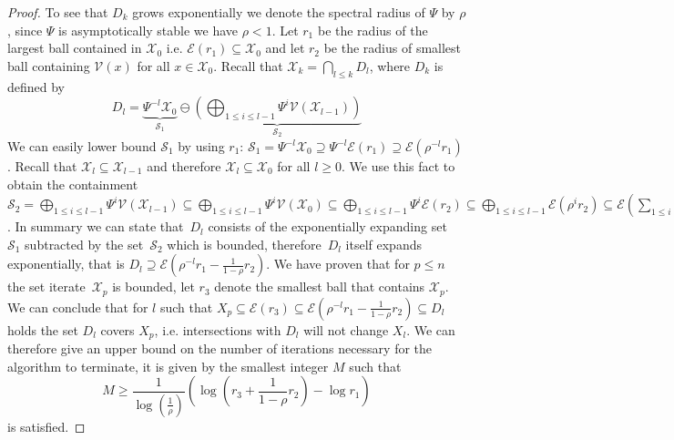 \documentclass[journal]{IEEEtran}
\theoremstyle{remark}
\theoremstyle{definition}
\begin{document}
\begin{proof}
To see that $D_k$ grows exponentially we denote the spectral radius of $\Psi$ by $\rho$, since $\Psi$ is asymptotically
stable we have $\rho<1$.
%
Let $r_1$ be the radius of the largest ball contained in $\mathcal X_0$ i.e. $\mathcal E(r_1)\subseteq\mathcal X_0$ 
and let $r_2$ be the radius of smallest ball containing $\mathcal V(x)$ for all $x\in\mathcal X_0$.
%
Recall that $\mathcal X_k = \bigcap_{l\leq k} D_l$, where $D_k$ is defined by
%
\begin{equation}
  D_l = \underbrace{\Psi^{-l}\mathcal X_0}_{\mathcal S_1} \ominus 
  \underbrace{\left(\bigoplus_{1\leq i\leq l-1} \Psi^{i}\mathcal V(\mathcal X_{l-1})\right)}_{\mathcal S_2}
\end{equation}
%
We can easily lower bound $\mathcal S_1$ by using $r_1$: $\mathcal S_1 = \Psi^{-l}\mathcal X_0 
\supseteq \Psi^{-l}\mathcal E(r_1) \supseteq \mathcal E(\rho^{-l} r_1)$.
%
Recall that $\mathcal X_l\subseteq\mathcal X_{l-1}$ and therefore $\mathcal X_l\subseteq\mathcal X_0$ for all $l\geq0$.
%
We use this fact to obtain the containment $\mathcal S_2 = \bigoplus_{1\leq i\leq l-1} 
\Psi^{i}\mathcal V(\mathcal X_{l-1})\subseteq \bigoplus_{1\leq i\leq l-1} \Psi^{i}\mathcal V(\mathcal X_0)\subseteq
\bigoplus_{1\leq i\leq l-1} \Psi^{i}\mathcal E(r_2)\subseteq\bigoplus_{1\leq i\leq l-1} \mathcal E(\rho^{i} r_2)\subseteq
\mathcal E(\sum_{1\leq i\leq l-1}\rho^i r_2)\subseteq \mathcal E(\frac{1}{1-\rho} r_2)$.
%
In summary we can state that~$D_l$ consists of the exponentially expanding set~$\mathcal S_1$
subtracted by the set~$\mathcal S_2$ which is bounded, therefore~$D_l$ itself expands exponentially,
that is $D_l\supseteq\mathcal E(\rho^{-l} r_1 - \frac{1}{1-\rho} r_2)$.
%
We have proven that for $p\leq n$ the set iterate~$\mathcal X_p$ is bounded, let $r_3$ denote the smallest 
ball that contains $\mathcal X_p$.
%
We can conclude that for $l$ such that $X_p\subseteq\mathcal E(r_3)\subseteq\mathcal 
E(\rho^{-l} r_1 - \frac{1}{1-\rho} r_2)\subseteq D_l$ holds the set $D_l$ covers
$X_p$, i.e. intersections with $D_l$ will not change $X_l$.
%
We can therefore give an upper bound on the number of iterations necessary for the algorithm
to terminate, it is given by the smallest integer $M$ such that
\begin{equation}\label{bnd:first:lower:bound:on:iteration:count}
  M\geq \frac{1}{\log(\frac{1}{\rho})}\left(\log\left(r_3+\frac{1}{1-\rho}r_2\right)-\log r_1 \right)
\end{equation}
is satisfied.
\end{proof}
%
\end{document}
